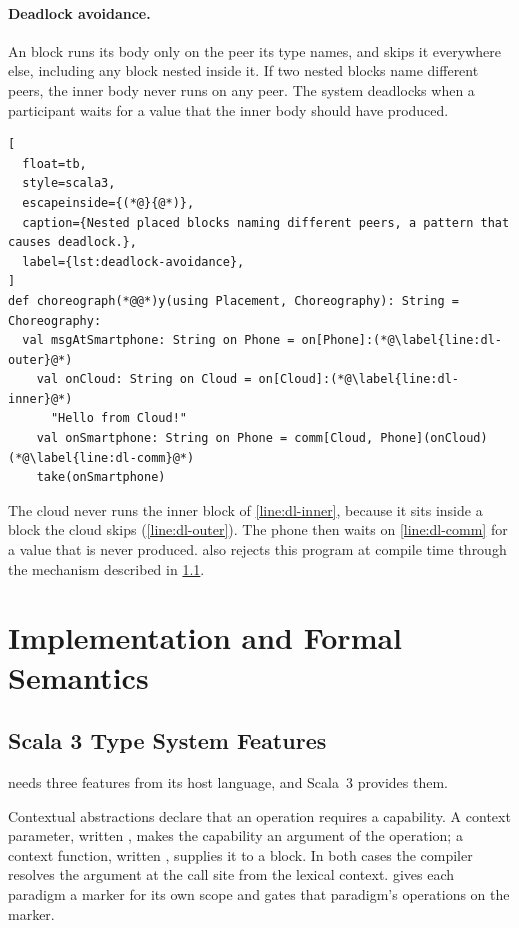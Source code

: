 \paragraph{Deadlock avoidance.}
An  block runs its body only on the peer its type names, and skips it everywhere else,
including any block nested inside it.
%
If two nested  blocks name different peers, the inner body never runs on any peer.
The system deadlocks when a participant waits for a value that the inner body should have produced.

\begin{lstlisting}[
  float=tb,
  style=scala3,
  escapeinside={(*@}{@*)},
  caption={Nested placed blocks naming different peers, a pattern that causes deadlock.},
  label={lst:deadlock-avoidance},
]
def choreograph(*@@*)y(using Placement, Choreography): String = Choreography:
  val msgAtSmartphone: String on Phone = on[Phone]:(*@\label{line:dl-outer}@*)
    val onCloud: String on Cloud = on[Cloud]:(*@\label{line:dl-inner}@*)
      "Hello from Cloud!"
    val onSmartphone: String on Phone = comm[Cloud, Phone](onCloud)(*@\label{line:dl-comm}@*)
    take(onSmartphone)
\end{lstlisting}

The cloud never runs the inner block of \cref{line:dl-inner},
because it sits inside a block the cloud skips (\cref{line:dl-outer}).
%
The phone then waits on \cref{line:dl-comm} for a value that is never produced.
%
\camil also rejects this program at compile time through the mechanism described in \cref{subsec:scala3-machinery}.

\section{Implementation and Formal Semantics}
\label{sec:camil-realisation}

\subsection{Scala 3 Type System Features}
\label{subsec:scala3-machinery}

\camil needs three features from its host language, and Scala~3 provides them.

Contextual abstractions declare that an operation requires a capability.
%
A context parameter, written , makes the capability an argument of the operation;
a context function, written , supplies it to a block.
%
In both cases the compiler resolves the argument at the call site from the lexical context.
%
\camil gives each paradigm a marker for its own scope and gates that paradigm's operations on the marker.

